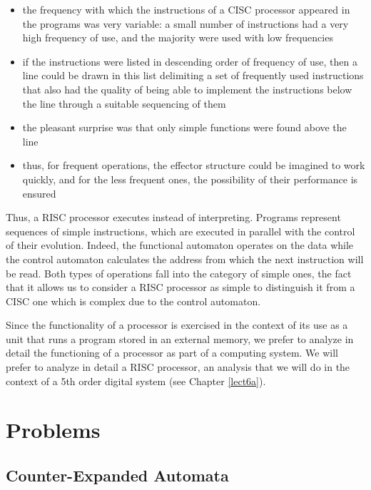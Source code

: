\begin{itemize}
    \item the frequency with which the instructions of a CISC processor appeared in the programs was very variable: a small number of instructions had a very high frequency of use, and the majority were used with low frequencies

    \item if the instructions were listed in descending order of frequency of use, then a line could be drawn in this list delimiting a set of frequently used instructions that also had the quality of being able to implement the instructions below the line through a suitable sequencing of them

    \item the pleasant surprise was that only simple functions were found above the line

    \item thus, for frequent operations, the effector structure could be imagined to work quickly, and for the less frequent ones, the possibility of their performance is ensured
\end{itemize}
Thus, a RISC processor executes instead of interpreting. Programs represent sequences of simple instructions, which are executed in parallel with the control of their evolution. Indeed, the functional automaton operates on the data while the control automaton calculates the address from which the next instruction will be read.
Both types of operations fall into the category of simple ones, the fact that it allows us to consider a RISC processor as simple to distinguish it from a CISC one which is complex due to the control automaton.

\bigskip

Since the functionality of a processor is exercised in the context of its use as a unit that runs a program stored in an external memory, we prefer to analyze in detail the functioning of a processor as part of a computing system. We will prefer to analyze in detail a RISC processor, an analysis that we will do in the context of a 5th order digital system (see Chapter \ref{lect6a}).


\section{Problems}

\subsection{Counter-Expanded Automata}

